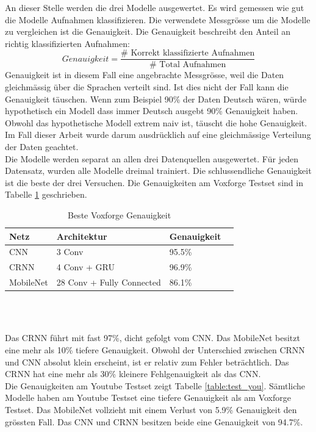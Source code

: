 An dieser Stelle werden die drei Modelle ausgewertet. Es wird gemessen wie gut die Modelle Aufnahmen klassifizieren. Die verwendete Messgrösse um die Modelle zu vergleichen ist die Genauigkeit. Die Genauigkeit beschreibt den Anteil an richtig klassifizierten Aufnahmen:
$$Genauigkeit = \frac{\# \text{ Korrekt klassifizierte Aufnahmen}}{\# \text{ Total Aufnahmen}}$$
Genauigkeit ist in diesem Fall eine angebrachte Messgrösse, weil die Daten gleichmässig über die Sprachen verteilt sind. Ist dies nicht der Fall kann die Genauigkeit täuschen. Wenn zum Beispiel 90\% der Daten Deutsch wären, würde hypothetisch ein Modell dass immer Deutsch ausgebt 90\% Genauigkeit haben. Obwohl das hypothetische Modell extrem naiv ist, täuscht die hohe Genauigkeit. Im Fall dieser Arbeit wurde darum ausdrücklich auf eine gleichmässige Verteilung der Daten geachtet.
\\ 
Die Modelle werden separat an allen drei Datenquellen ausgewertet. Für jeden Datensatz, wurden alle Modelle dreimal trainiert. Die schlussendliche Genauigkeit ist die beste der drei Versuchen. Die Genauigkeiten am Voxforge Testset sind in Tabelle \ref{table:test_vox} geschrieben.
\begin{table}[h]
	\centering
	\begin{tabular}{llll}
		\hline
		Netz & Architektur     & Genauigkeit \\ \hline
		CNN  & 3 Conv          & 95.5\%      \\
		CRNN & 4 Conv + GRU   & 96.9\%       \\
		MobileNet  & 28 Conv + Fully Connected & 86.1\%       \\ \hline
	\end{tabular} \\
	\caption{Beste Voxforge Genauigkeit}
	\label{table:test_vox}
\end{table}
\\Das CRNN führt mit fast 97\%, dicht gefolgt vom CNN. Das MobileNet besitzt eine mehr als 10\% tiefere Genauigkeit. Obwohl der Unterschied zwischen CRNN und CNN absolut klein erscheint, ist er relativ zum Fehler beträchtlich. Das CRNN hat eine mehr als 30\% kleinere Fehlgenauigkeit als das CNN.
\\ 
Die Genauigkeiten am Youtube Testset zeigt Tabelle \ref{table:test_you}. Sämtliche Modelle haben am Youtube Testset eine tiefere Genauigkeit als am Voxforge Testset. Das MobileNet vollzieht mit einem Verlust von 5.9\% Genauigkeit den grössten Fall. Das CNN und CRNN besitzen beide eine Genauigkeit von 94.7\%.
\\
